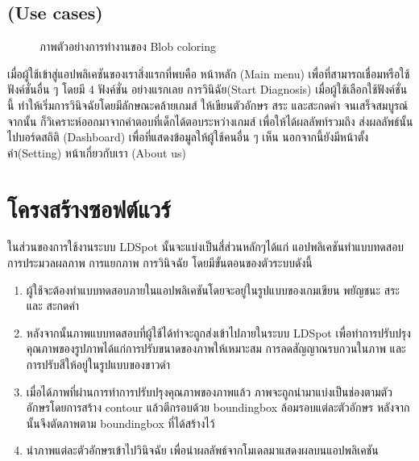\documentclass[12pt,oneside,openright,a4paper]{cpe-thai-project}
\begin{document}
\subsection{(Use cases)}
\begin{figure}[!ht]\centering
  \setlength{\fboxrule}{0.2mm} %
  \setlength{\fboxsep}{1cm}
  \caption{ภาพตัวอย่างการทำงานของ Blob coloring}\label{fig:usecase}
\end{figure}
เมื่อผู้ใช้เข้าสู่แอปพลิเคชันของเราสิ่งแรกที่พบคือ หน้าหลัก (Main menu) เพื่อที่สามารถเชื่อมหรือใช้ฟังค์ชั่นอื่น ๆ โดยมี 4 ฟังค์ชั่น อย่างแรกเลย 
การวินิฉัย(Start Diagnosis) เมื่อผู้ใช้เลือกใช้ฟังค์ชั่นนี้ ทำให้เริ่มการวินิจฉัยโดยมีลักษณะคล้ายเกมส์ ให้เขียนตัวอักษร สระ และสะกดคำ จนเสร็จสมบูรณ์จากนั้น ก็วิเคราะห์ออกมาจากคำตอบที่เด็กได้ตอบระหว่างเกมส์ 
เพื่อให้ได้ผลลัพท์รวมถึง ส่งผลลัพธ์นั้นไปบอร์ดสถิติ (Dashboard) เพื่อที่แสดงข้อมูลให้ผู้ใช้คนอื่น ๆ เห็น นอกจากนี้ยังมีหน้าตั้งค่า(Setting) หน้าเกี่ยวกับเรา (About us) 

\section{โครงสร้างซอฟต์แวร์}
ในส่วนของการใช้งานระบบ LDSpot นั้นจะแบ่งเป็นสี่ส่วนหลักๆได้แก่ แอปพลิเคชันทำแบบทดสอบ การประมวลผลภาพ การแยกภาพ การวินิจฉัย โดยมีขั้นตอนของตัวระบบดังนี้
\begin{enumerate}
  \item ผู้ใช้จะต้องทำแบบทดสอบภายในแอปพลิเคชันโดยจะอยู่ในรูปแบบของเกมเขียน พยัญชนะ สระ และ สะกดคำ
  \item หลังจากนั้นภาพแบบทดสอบที่ผู้ใช้ได้ทำจะถูกส่งเข้าไปภายในระบบ LDSpot เพื่อทำการปรับปรุงคุณภาพของรูปภาพได้แก่การปรับขนาดของภาพให้เหมาะสม การลดสัญญาณรบกวนในภาพ และการปรับสีให้อยู่ในรูปแบบของขาวดำ
  \item เมื่อได้ภาพที่ผ่านการทำการปรับปรุงคุณภาพของภาพแล้ว ภาพจะถูกนำมาแบ่งเป็นช่องตามตัวอักษรโดยการสร้าง contour แล้วตีกรอบด้วย boundingbox ล้อมรอบแต่ละตัวอักษร หลังจากนั้นจึงตัดภาพตาม boundingbox ที่ได้สร้างไว้
  \item นำภาพแต่ละตัวอักษรเข้าไปวินิจฉัย เพื่อนำผลลัพธ์จากโมเดลมาแสดงผลบนแอปพลิเคชัน
\end{enumerate}
\end{document}
